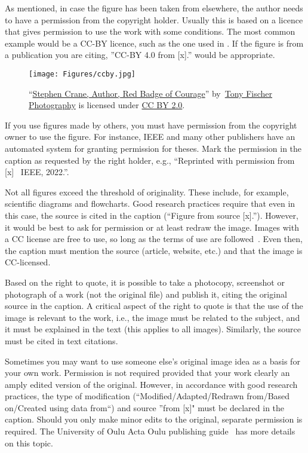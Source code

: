 As mentioned, in case the figure has been taken from elsewhere, the
author needs to have a permission from the copyright holder. Usually
this is based on a licence that gives permission to use the work with
some conditions. The most common example would be a CC-BY licence,
such as the one used in . If the figure is from a
publication you are citing, ”CC-BY 4.0 from [x].” would
 be appropriate.

\begin{figure}[H]
  \begin{center}
    \texttt{[image: Figures/ccby.jpg]}
  \end{center}
    \caption{\enquote{\href{https://openverse.org/image/110032f8-1a7a-421f-86b1-88fdfde2e44f }{Stephen Crane, Author, Red Badge of Courage}} by~\href{https://www.flickr.com/photos/tonythemisfit/}{Tony Fischer Photography} is licensed under \href{https://creativecommons.org/licenses/by/2.0/}{CC BY 2.0}.}
    \label{fig:ccbypic}
\end{figure}

If you use figures made by others, you must have permission from the
copyright owner to use the figure. For instance, IEEE and many other
publishers have an automated system for granting permission for
theses. Mark the permission in the caption as requested by the right
holder, e.g., “Reprinted with permission from [x] \textcopyright\ IEEE, 2022.”.

Not all figures exceed the threshold of originality. These include,
for example, scientific diagrams and flowcharts. Good research
practices require that even in this case, the source is cited in the
caption (\enquote{Figure from source [x].}). However, it would be best to ask
for permission or at least redraw the image. Images with a CC license 
are free to use, so long as the terms of use are followed~\cite{about_cc_licenses}. Even then, the
caption must mention the source (article, website, etc.) and that the
image is CC-licensed.

Based on the right to quote, it is possible to take a photocopy,
screenshot or photograph of a work (not the original file) and publish
it, citing the original source in the caption. A critical aspect of
the right to quote is that the use of the image is relevant to the
work, i.e., the image must be related to the subject, and it must be
explained in the text (this applies to all images). Similarly, the
source must be cited in text citations.

Sometimes you may want to use someone else's original image idea as a
basis for your own work. Permission is not required provided that your
work clearly an amply edited version of the original. However, in
accordance with good research practices, the type of modification
(“Modified/Adapted/Redrawn from/Based on/Created using
data from\enquote{) and source }from [x]" must be declared in
the caption. Should you only make minor edits to the original,
separate permission is required. The University of Oulu Acta Oulu
publishing guide~\cite{ronkainen_copyright, ronkainen_tekijanoikeus}
has more details on this topic.

